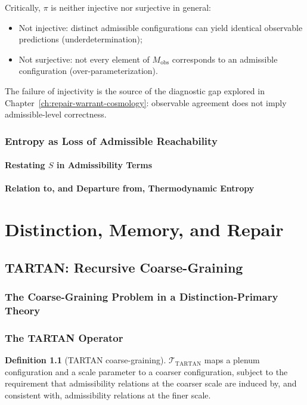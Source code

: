 \documentclass[12pt,a4paper,twoside,openright]{book}
\theoremstyle{plain}
\theoremstyle{definition}
\newtheorem{definition}[theorem]{Definition}
\theoremstyle{remark}
\newcommand{\Sfield}{S}
\newcommand{\Mobs}{M_{\mathrm{obs}}}
\newcommand{\TARTANop}{\mathcal{T}_{\mathrm{TARTAN}}}
\begin{document}
Critically, $\pi$ is neither injective nor surjective in general:
\begin{itemize}
\item Not injective: distinct admissible configurations can yield identical observable predictions (underdetermination);
\item Not surjective: not every element of $\Mobs$ corresponds to an admissible configuration (over-parameterization).
\end{itemize}

The failure of injectivity is the source of the diagnostic gap explored in Chapter~\ref{ch:repair-warrant-cosmology}: observable agreement does not imply admissible-level correctness.

\section{Entropy as Loss of Admissible Reachability}

\subsection{Restating \texorpdfstring{$\Sfield$}{S} in Admissibility Terms}
\subsection{Relation to, and Departure from, Thermodynamic Entropy}


\part{Distinction, Memory, and Repair}

\chapter{TARTAN: Recursive Coarse-Graining}
\label{ch:tartan}

\section{The Coarse-Graining Problem in a Distinction-Primary Theory}

\section{The TARTAN Operator}

\begin{definition}[TARTAN coarse-graining]
$\TARTANop$ maps a plenum configuration and a scale parameter to a coarser configuration, subject to the requirement that admissibility relations at the coarser scale are induced by, and consistent with, admissibility relations at the finer scale.
\end{definition}
\end{document}
